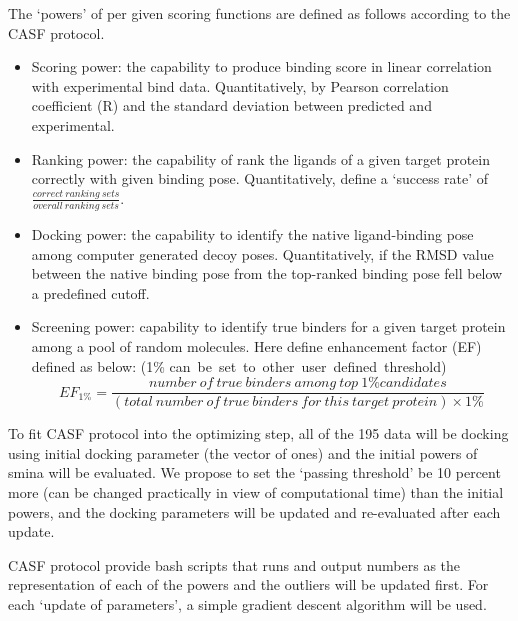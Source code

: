 The `powers' of per given scoring functions are defined as follows according to the CASF protocol.
\begin{itemize}
	\item Scoring power: the capability to produce binding score in linear correlation with experimental bind data. Quantitatively, by Pearson correlation coefficient (R) and the standard deviation between predicted and experimental. 
	\item Ranking power: the capability of rank the ligands of a given target protein correctly with given binding pose. Quantitatively, define a `success rate' of $\frac{correct~ranking~sets}{overall~ranking~sets}$.
	\item Docking power: the capability to identify the native ligand-binding pose among computer generated decoy poses. Quantitatively, if the RMSD value between the native binding pose from the top-ranked binding pose fell below a predefined cutoff.
	\item Screening power: capability to identify true binders for a given target protein among a pool of random molecules. Here define enhancement factor (EF) defined as below: (1\% can~be~set~to~other~user~defined~threshold)
	\begin{equation*}
	EF_{1\%} = \frac{number~of~true~binders~among~top~1\% candidates}{(total~number~of~true~binders~for~this~target~protein) \times 1\%} 
	\end{equation*}
\end{itemize}

To fit CASF protocol into the optimizing step, all of the 195 data will be docking using initial docking parameter (the vector of ones) and the initial powers of smina will be evaluated. 
We propose to set the `passing threshold' be 10 percent more (can be changed practically in view of computational time) than the initial powers, and the docking parameters will be updated and re-evaluated after each update.

CASF protocol provide bash scripts that runs and output numbers as the representation of each of the powers and the outliers will be updated first.
For each `update of parameters', a simple gradient descent algorithm will be used.



